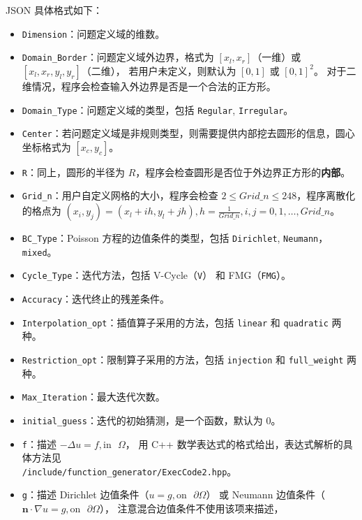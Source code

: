 \documentclass[lang=cn,a4paper,newtx,bibend=bibtex]{elegantpaper}
\begin{document}
JSON 具体格式如下：
\begin{itemize}
  \item \lstinline{Dimension}：问题定义域的维数。
  \item \lstinline{Domain_Border}：问题定义域外边界，格式为 $[x_l, x_r]$（一维）或 $[x_l, x_r, y_l, y_r]$（二维），
  若用户未定义，则默认为 $[0, 1]$ 或 $[0, 1]^2$。
  对于二维情况，程序会检查输入外边界是否是一个合法的正方形。
  \item \lstinline{Domain_Type}：问题定义域的类型，包括 \lstinline{Regular}, \lstinline{Irregular}。
  \item \lstinline{Center}：若问题定义域是非规则类型，则需要提供内部挖去圆形的信息，圆心坐标格式为 $[x_c, y_c]$。
  \item \lstinline{R}：同上，圆形的半径为 $R$，程序会检查圆形是否位于外边界正方形的\textbf{内部}。
  \item \lstinline{Grid_n}：用户自定义网格的大小，程序会检查 $2 \le Grid\_n \le 248$，程序离散化的格点为 $(x_i, y_j) = (x_l + ih, y_l + jh), h = \frac1{Grid\_n}, i, j = 0, 1, \dots, Grid\_n$。
  \item \lstinline{BC_Type}：Poisson 方程的边值条件的类型，包括 \lstinline{Dirichlet}, \lstinline{Neumann}，\lstinline{mixed}。
  \item \lstinline{Cycle_Type}：迭代方法，包括 V-Cycle（\texttt{V}） 和 FMG（\texttt{FMG}）。
  \item \lstinline{Accuracy}：迭代终止的残差条件。
  \item \lstinline{Interpolation_opt}：插值算子采用的方法，包括 \lstinline{linear} 和 \lstinline{quadratic} 两种。
  \item \lstinline{Restriction_opt}：限制算子采用的方法，包括 \lstinline{injection} 和 \lstinline{full_weight} 两种。
  \item \lstinline{Max_Iteration}：最大迭代次数。
  \item \lstinline{initial_guess}：迭代的初始猜测，是一个函数，默认为 0。
  \item \lstinline{f}：描述 $- \Delta u = f, \text{in~~} \Omega$，
                       用 C++ 数学表达式的格式给出，表达式解析的具体方法见 \\
                       \texttt{/include/function\_generator/ExecCode2.hpp}。
  \item \lstinline{g}：描述 Dirichlet 边值条件（$u = g, \text{on~~} \partial \Omega$）
                       或 Neumann 边值条件（$\bm{n} \cdot \nabla u = g, \text{on~~} \partial \Omega$），
                       注意混合边值条件不使用该项来描述，

\end{itemize}
\end{document}
